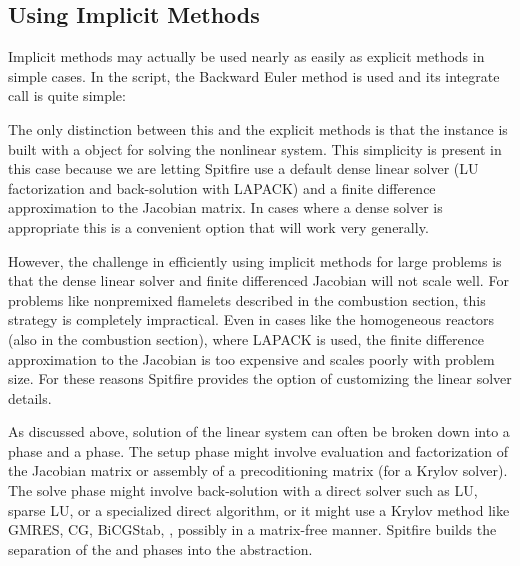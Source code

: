 \documentclass[letterpaper,10pt,english]{sphinxmanual}
\begin{document}
\subsection{Using Implicit Methods}
\label{\detokenize{timeintegration:using-implicit-methods}}
Implicit methods may actually be used nearly as easily as explicit methods in simple cases.
In the  script, the Backward Euler method is used and its integrate call is quite simple:

\begin{sphinxVerbatim}[commandchars=\\\{\}]
    
\end{sphinxVerbatim}

The only distinction between this and the explicit methods is that the  instance is built with a
 object for solving the nonlinear system.
This simplicity is present in this case because we are letting Spitfire use a default dense linear solver (LU factorization and back-solution with LAPACK)
and a finite difference approximation to the Jacobian matrix.
In cases where a dense solver is appropriate this is a convenient option that will work very generally.

However, the challenge in efficiently using implicit methods for large problems is that the dense linear solver and
finite differenced Jacobian will not scale well.
For problems like nonpremixed flamelets described in the combustion section, this strategy is completely impractical.
Even in cases like the homogeneous reactors (also in the combustion section), where LAPACK is used, the finite
difference approximation to the Jacobian is too expensive and scales poorly with problem size.
For these reasons Spitfire provides the option of customizing the linear solver details.

As discussed above, solution of the linear system can often be broken down into a  phase and a  phase.
The setup phase might involve evaluation and factorization of the Jacobian matrix or assembly of a precoditioning matrix (for a Krylov solver).
The solve phase might involve back-solution with a direct solver such as LU, sparse LU, or a specialized direct algorithm,
or it might use a Krylov method like GMRES, CG, BiCGStab, , possibly in a matrix-free manner.
Spitfire builds the separation of the  and  phases into the abstraction.
\end{document}

